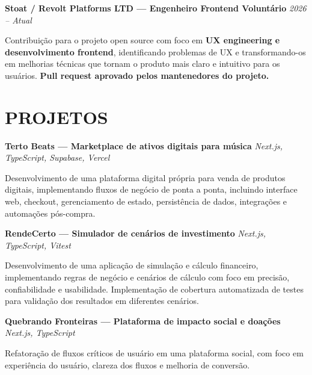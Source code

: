 \documentclass[10pt,a4paper]{article}
\begin{document}
\noindent
\textbf{Stoat / Revolt Platforms LTD — Engenheiro Frontend Voluntário}
\hfill
\textit{2026 -- Atual}

\footnotesize

Contribuição para o projeto open source com foco em
\textbf{UX engineering e desenvolvimento frontend}, identificando
problemas de UX e transformando-os em melhorias técnicas que tornam
o produto mais claro e intuitivo para os usuários.
\textbf{Pull request aprovado pelos mantenedores do projeto.}


\section*{PROJETOS}

\noindent
\textbf{Terto Beats — Marketplace de ativos digitais para música}
\hfill
\textit{Next.js, TypeScript, Supabase, Vercel}

\footnotesize

Desenvolvimento de uma plataforma digital própria para venda de
produtos digitais, implementando fluxos de negócio de ponta a ponta,
incluindo interface web, checkout, gerenciamento de estado,
persistência de dados, integrações e automações pós-compra.

\vspace{0.5pt}

\noindent
\textbf{RendeCerto — Simulador de cenários de investimento}
\hfill
\textit{Next.js, TypeScript, Vitest}

\footnotesize

Desenvolvimento de uma aplicação de simulação e cálculo financeiro,
implementando regras de negócio e cenários de cálculo com foco em
precisão, confiabilidade e usabilidade. Implementação de cobertura
automatizada de testes para validação dos resultados em diferentes
cenários.

\vspace{0.5pt}

\noindent
\textbf{Quebrando Fronteiras — Plataforma de impacto social e doações}
\hfill
\textit{Next.js, TypeScript}

\footnotesize

Refatoração de fluxos críticos de usuário em uma plataforma social,
com foco em experiência do usuário, clareza dos fluxos e melhoria
de conversão.

\end{document}
